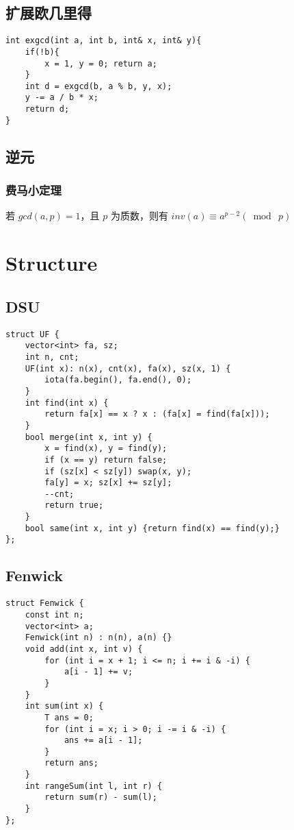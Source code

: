 \documentclass[twocolumn,a4]{article}
\begin{document}
\subsection{扩展欧几里得}
\begin{lstlisting}
int exgcd(int a, int b, int& x, int& y){
    if(!b){
        x = 1, y = 0; return a;
    }
    int d = exgcd(b, a % b, y, x);
    y -= a / b * x;
    return d; 
}
\end{lstlisting}

\subsection{逆元}
\subsubsection*{费马小定理}
若 $gcd(a, p) = 1$，且 $p$ 为质数，则有 $inv(a) \equiv a^{p - 2}(\bmod \ p)$


\section{Structure}

\subsection{DSU}
\begin{lstlisting}
struct UF {
    vector<int> fa, sz;
    int n, cnt;
    UF(int x): n(x), cnt(x), fa(x), sz(x, 1) {
        iota(fa.begin(), fa.end(), 0);
    }
    int find(int x) {
        return fa[x] == x ? x : (fa[x] = find(fa[x]));
    }
    bool merge(int x, int y) {
        x = find(x), y = find(y);
        if (x == y) return false;
        if (sz[x] < sz[y]) swap(x, y);
        fa[y] = x; sz[x] += sz[y];
        --cnt;
        return true;
    }
    bool same(int x, int y) {return find(x) == find(y);}
};
\end{lstlisting}


\subsection{Fenwick}
\begin{lstlisting}
struct Fenwick {
    const int n;
    vector<int> a;
    Fenwick(int n) : n(n), a(n) {}
    void add(int x, int v) {
        for (int i = x + 1; i <= n; i += i & -i) {
            a[i - 1] += v;
        }
    }
    int sum(int x) {
        T ans = 0;
        for (int i = x; i > 0; i -= i & -i) {
            ans += a[i - 1];
        }
        return ans;
    }
    int rangeSum(int l, int r) {
        return sum(r) - sum(l);
    }
};
\end{lstlisting}
\end{document}
